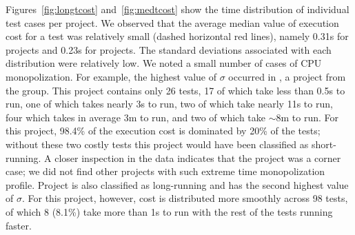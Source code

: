 \sloppy Figures~\ref{fig:longtcost} and~\ref{fig:medtcost} show the
time distribution of individual test cases per project.  We observed
that the average median value of execution cost for a test was
relatively small (dashed horizontal red lines), namely 0.31s for
\medg{} projects and 0.23s for \longg{} projects.  The standard
deviations associated with each distribution were relatively
low.  We noted a small number of
cases of CPU monopolization.  For example, the highest value of
$\sigma$ occurred in , a project from the
\longg{} group.  This project contains only 26 tests, 17 of which take
less than 0.5s to run, one of which takes nearly 3s to run, two of
which take nearly 11s to run, four which takes in average 3m to run, and two of
which take $\sim$8m to run.  For this project, 98.4\% of the
execution cost is dominated by 20\% of the tests; without these
two costly tests this project would have been classified as
short-running.  A closer inspection in the data indicates that the
project  was a corner case; we did not find
other projects with such extreme time monopolization profile.
Project  is also classified as
long-running and has the second highest value of $\sigma$.
For this project, however, cost is distributed more smoothly across 98
tests, of which 8 (8.1\%) take more than 1s to run with the rest of
the tests running faster.

